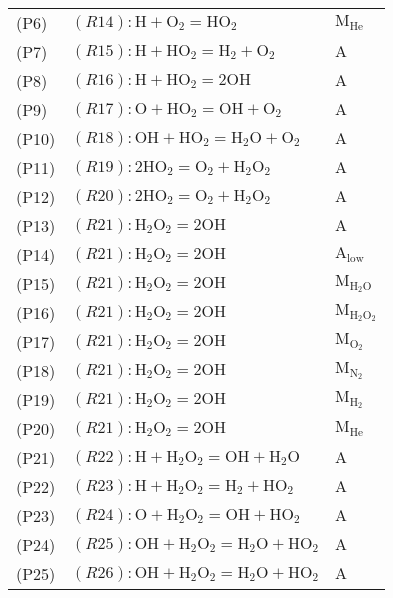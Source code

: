 \documentclass[preprint,3p,times,twocolumn]{elsarticle}
\begin{document}
\begin{itemize}
\begin{table}[htp]
\begin{tabular}{l l l}
(P6)&$ (R14): \mathrm{H} + \mathrm{O}_2 = \mathrm{HO}_2     $&$ \mathrm{M}_{\mathrm{He}}$\\
(P7)&$ (R15): \mathrm{H} + \mathrm{HO}_2 = \mathrm{H}_2 + \mathrm{O}_2     $&$ \mathrm{A}$\\
(P8)&$ (R16): \mathrm{H} + \mathrm{HO}_2 = 2\mathrm{OH}     $&$ \mathrm{A}$\\
(P9)&$ (R17): \mathrm{O} + \mathrm{HO}_2 = \mathrm{OH} + \mathrm{O}_2     $&$ \mathrm{A}$\\
(P10)&$ (R18): \mathrm{OH} + \mathrm{HO}_2 = \mathrm{H}_2\mathrm{O} + \mathrm{O}_2     $&$ \mathrm{A}$\\
(P11)&$ (R19): 2\mathrm{HO}_2 = \mathrm{O}_2 + \mathrm{H}_2\mathrm{O}_2     $&$ \mathrm{A}$\\
(P12)&$ (R20): 2\mathrm{HO}_2 = \mathrm{O}_2 + \mathrm{H}_2\mathrm{O}_2     $&$ \mathrm{A}$\\
(P13)&$ (R21): \mathrm{H}_2\mathrm{O}_2 = 2\mathrm{OH}     $&$ \mathrm{A}$\\
(P14)&$ (R21): \mathrm{H}_2\mathrm{O}_2 = 2\mathrm{OH}     $&$ \mathrm{A}_\mathrm{low}$\\
(P15)&$ (R21): \mathrm{H}_2\mathrm{O}_2 = 2\mathrm{OH}     $&$ \mathrm{M}_{\mathrm{H}_2\mathrm{O}}$\\
(P16)&$ (R21): \mathrm{H}_2\mathrm{O}_2 = 2\mathrm{OH}     $&$ \mathrm{M}_{\mathrm{H}_2\mathrm{O}_2}$\\
(P17)&$ (R21): \mathrm{H}_2\mathrm{O}_2 = 2\mathrm{OH}     $&$ \mathrm{M}_{\mathrm{O}_2}$\\
(P18)&$ (R21): \mathrm{H}_2\mathrm{O}_2 = 2\mathrm{OH}     $&$ \mathrm{M}_{\mathrm{N}_2}$\\
(P19)&$ (R21): \mathrm{H}_2\mathrm{O}_2 = 2\mathrm{OH}     $&$ \mathrm{M}_{\mathrm{H}_2}$\\
(P20)&$ (R21): \mathrm{H}_2\mathrm{O}_2 = 2\mathrm{OH}     $&$ \mathrm{M}_{\mathrm{He}}$\\
(P21)&$ (R22): \mathrm{H} + \mathrm{H}_2\mathrm{O}_2 = \mathrm{OH} + \mathrm{H}_2\mathrm{O}     $&$ \mathrm{A}$\\
(P22)&$ (R23): \mathrm{H} + \mathrm{H}_2\mathrm{O}_2 = \mathrm{H}_2 + \mathrm{HO}_2     $&$ \mathrm{A}$\\
(P23)&$ (R24): \mathrm{O} + \mathrm{H}_2\mathrm{O}_2 = \mathrm{OH} + \mathrm{HO}_2     $&$ \mathrm{A}$\\
(P24)&$ (R25): \mathrm{OH} + \mathrm{H}_2\mathrm{O}_2 = \mathrm{H}_2\mathrm{O} + \mathrm{HO}_2     $&$ \mathrm{A}$\\
(P25)&$ (R26): \mathrm{OH} + \mathrm{H}_2\mathrm{O}_2 = \mathrm{H}_2\mathrm{O} + \mathrm{HO}_2     $&$ \mathrm{A}$\\

\end{tabular}
\end{table}
\end{itemize}
\end{document}
